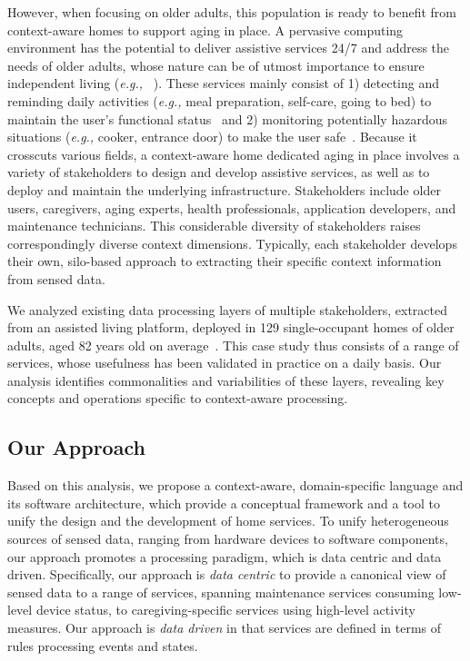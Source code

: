 

However, when focusing on older adults, this population is ready to benefit from context-aware homes to support aging in place. A pervasive computing environment has the potential to deliver assistive services 24/7 and address the needs of older adults, whose nature can be of utmost importance to ensure independent living ({\em e.g.,} ~\cite{rashidi2013survey}). These services mainly consist of 1) detecting and reminding daily activities ({\em e.g.,} meal preparation, self-care, going to bed) to maintain the user's functional status~\cite{caroux2014verification} and 2) monitoring potentially hazardous situations ({\em e.g.,} cooker, entrance door) to make the user safe~\cite{rashidi2013survey}. Because it crosscuts various fields, a context-aware home dedicated aging in place involves a variety of stakeholders to design and develop assistive services, as well as to deploy and maintain the underlying infrastructure. Stakeholders include older users, caregivers, aging experts, health professionals, application developers, and maintenance technicians. This considerable diversity of stakeholders raises correspondingly diverse context dimensions. Typically, each stakeholder develops their own, silo-based approach to extracting their specific context information from sensed data.

We analyzed existing data processing layers of multiple stakeholders, extracted from an assisted living platform, deployed in 129 single-occupant homes of older adults, aged 82 years old on average~\cite{consel2017homeassist}. This case study thus consists of a range of services, whose usefulness has been validated in practice on a daily basis. Our analysis identifies commonalities and variabilities of these layers, revealing key concepts and operations specific to context-aware processing. 

\subsection*{Our Approach}
Based on this analysis, we propose a context-aware, domain-specific language and its software architecture, which provide a conceptual framework and a tool to unify the design and the development of home services. To unify heterogeneous sources of sensed data, ranging from hardware devices to software components, our approach promotes a processing paradigm, which is data centric and data driven. Specifically, our approach is {\em data centric} to provide a canonical view of sensed data to a range of services, spanning maintenance services consuming low-level device status, to caregiving-specific services using high-level activity measures. Our approach is {\em data driven} in that services are defined in terms of rules processing events and states.

